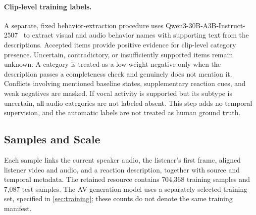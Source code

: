 \paragraph{Clip-level training labels.}
A separate, fixed behavior-extraction procedure uses Qwen3-30B-A3B-Instruct-2507~\cite{qwen3} to extract visual and audio behavior names with supporting text from the descriptions. Accepted items provide positive evidence for clip-level category presence. Uncertain, contradictory, or insufficiently supported items remain unknown. A category is treated as a low-weight negative only when the description passes a completeness check and genuinely does not mention it. Conflicts involving mentioned baseline states, supplementary reaction cues, and weak negatives are masked. If vocal activity is supported but its subtype is uncertain, all audio categories are not labeled absent. This step adds no temporal supervision, and the automatic labels are not treated as human ground truth.

\subsection{Samples and Scale}
Each sample links the current speaker audio, the listener's first frame, aligned listener video and audio, and a reaction description, together with source and temporal metadata. The retained resource contains 704,368 training samples and 7,087 test samples. The AV generation model uses a separately selected training set, specified in \cref{sec:training}; these counts do not denote the same training manifest.

